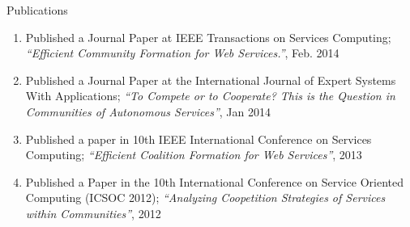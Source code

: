 \documentclass{beamer}
\begin{document}
\begin{frame}{Publications}

    \begin{enumerate}
        \item Published a Journal Paper at IEEE Transactions on Services Computing; \emph{``Efficient Community Formation for Web Services.''}, Feb. 2014
        \item Published a Journal Paper at the International Journal of Expert Systems With Applications; \emph{``To Compete or to Cooperate? This is the Question in Communities of Autonomous Services''}, Jan 2014
        \item Published a paper in 10th IEEE International Conference on Services Computing; \emph{``Efficient Coalition Formation for Web Services''}, 2013
        \item Published a Paper in the 10th International Conference on Service Oriented Computing (ICSOC 2012); \emph{``Analyzing Coopetition Strategies of Services within Communities''}, 2012
    \end{enumerate}


\end{frame}

%
\end{document}
